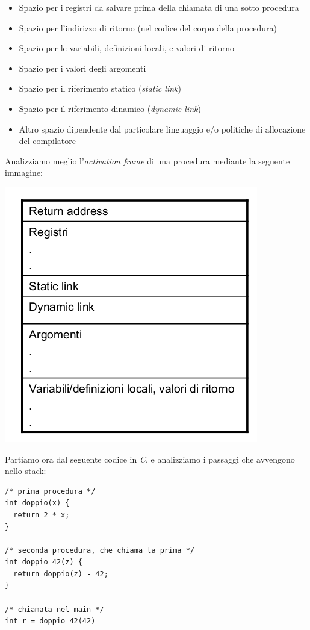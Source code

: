 \documentclass[a4paper,12pt, oneside]{book}
\begin{document}
\begin{itemize}
	\item Spazio per i registri da salvare prima della chiamata di una sotto procedura
	\item Spazio per l'indirizzo di ritorno (nel codice del corpo della procedura)
	\item Spazio per le variabili, definizioni locali, e valori di ritorno
	\item Spazio per i valori degli argomenti
	\item Spazio per il riferimento statico (\textit{static link})
	\item Spazio per il riferimento dinamico (\textit{dynamic link})
	\item Altro spazio dipendente dal particolare linguaggio e/o politiche di allocazione del compilatore
\end{itemize}
Analizziamo meglio l'\textit{activation frame} di una procedura mediante la seguente immagine:
\begin{center}
	\includegraphics[scale=0.6]{img/act.png}
\end{center}
\newpage
Partiamo ora dal seguente codice in \textit{C}, e analizziamo i passaggi che avvengono nello stack:
\begin{verbatim}
/* prima procedura */
int doppio(x) { 
  return 2 * x; 
}

/* seconda procedura, che chiama la prima */
int doppio_42(z) { 
  return doppio(z) - 42; 
}

/* chiamata nel main */
int r = doppio_42(42)
\end{verbatim}
\end{document}
